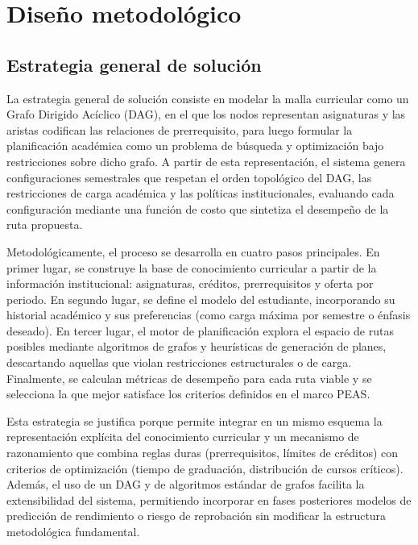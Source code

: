 \section{Diseño metodológico}

\subsection{Estrategia general de solución}

La estrategia general de solución consiste en modelar la malla curricular como un Grafo Dirigido Acíclico (DAG), en el que los nodos representan asignaturas y las aristas codifican las relaciones de prerrequisito, para luego formular la planificación académica como un problema de búsqueda y optimización bajo restricciones sobre dicho grafo. A partir de esta representación, el sistema genera configuraciones semestrales que respetan el orden topológico del DAG, las restricciones de carga académica y las políticas institucionales, evaluando cada configuración mediante una función de costo que sintetiza el desempeño de la ruta propuesta.

Metodológicamente, el proceso se desarrolla en cuatro pasos principales. En primer lugar, se construye la base de conocimiento curricular a partir de la información institucional: asignaturas, créditos, prerrequisitos y oferta por periodo. En segundo lugar, se define el modelo del estudiante, incorporando su historial académico y sus preferencias (como carga máxima por semestre o énfasis deseado). En tercer lugar, el motor de planificación explora el espacio de rutas posibles mediante algoritmos de grafos y heurísticas de generación de planes, descartando aquellas que violan restricciones estructurales o de carga. Finalmente, se calculan métricas de desempeño para cada ruta viable y se selecciona la que mejor satisface los criterios definidos en el marco PEAS.

Esta estrategia se justifica porque permite integrar en un mismo esquema la representación explícita del conocimiento curricular y un mecanismo de razonamiento que combina reglas duras (prerrequisitos, límites de créditos) con criterios de optimización (tiempo de graduación, distribución de cursos críticos). Además, el uso de un DAG y de algoritmos estándar de grafos facilita la extensibilidad del sistema, permitiendo incorporar en fases posteriores modelos de predicción de rendimiento o riesgo de reprobación sin modificar la estructura metodológica fundamental.

\pagebreak

